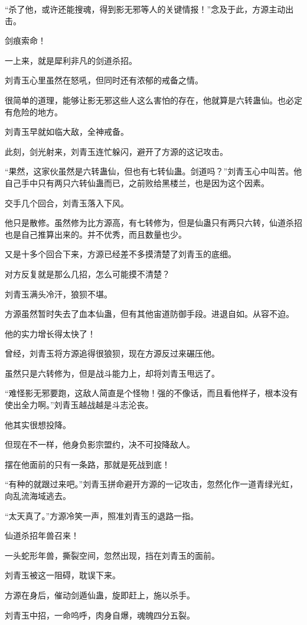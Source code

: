 \begin{this_body}
“杀了他，或许还能搜魂，得到影无邪等人的关键情报！”念及于此，方源主动出击。

剑痕索命！

一上来，就是犀利非凡的剑道杀招。

刘青玉心里虽然在怒吼，但同时还有浓郁的戒备之情。

很简单的道理，能够让影无邪这些人这么害怕的存在，他就算是六转蛊仙。也必定有危险的地方。

刘青玉早就如临大敌，全神戒备。

此刻，剑光射来，刘青玉连忙躲闪，避开了方源的这记攻击。

“果然，这家伙虽然是六转蛊仙，但也有七转仙蛊。剑道吗？”刘青玉心中叫苦。他自己手中只有两只六转仙蛊而已，之前败给黑楼兰，也是因为这个因素。

交手几个回合，刘青玉落入下风。

他只是散修。虽然修为比方源高，有七转修为，但是仙蛊只有两只六转，仙道杀招也是自己推算出来的。并不优秀，而且数量也少。

又是十多个回合下来，方源已经差不多摸清楚了刘青玉的底细。

对方反复就是那么几招，怎么可能摸不清楚？

刘青玉满头冷汗，狼狈不堪。

方源虽然暂时失去了血本仙蛊，但有其他宙道防御手段。进退自如。从容不迫。

他的实力增长得太快了！

曾经，刘青玉将方源追得很狼狈，现在方源反过来碾压他。

虽然只是六转修为，但是战斗能力上，却将刘青玉甩远了。

“难怪影无邪要跑，这敌人简直是个怪物！强的不像话，而且看他样子，根本没有使出全力啊。”刘青玉越战越是斗志沦丧。

他其实很想投降。

但现在不一样，他身负影宗盟约，决不可投降敌人。

摆在他面前的只有一条路，那就是死战到底！

“有种的就跟过来吧。”刘青玉拼命避开方源的一记攻击，忽然化作一道青绿光虹，向乱流海域逃去。

“太天真了。”方源冷笑一声，照准刘青玉的退路一指。

仙道杀招年兽召来！

一头蛇形年兽，撕裂空间，忽然出现，挡在刘青玉的面前。

刘青玉被这一阻碍，耽误下来。

方源在身后，催动剑遁仙蛊，旋即赶上，施以杀手。

刘青玉中招，一命呜呼，肉身自爆，魂魄四分五裂。


\end{this_body}
